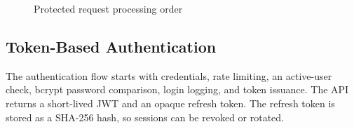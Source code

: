 \documentclass[letterpaper%
, oneside%
, 12pt%
, memoireprojet%
, english%
,creativecommons,hyperref, withAlgo2e %
]{thETS}
\begin{document}
\begin{figure}[htbp]
\centering
{}
\caption{Protected request processing order}
\label{fig:authorization_flow}
\end{figure}

\subsection{Token-Based Authentication}
The authentication flow starts with credentials, rate limiting, an active-user check, bcrypt password comparison, login logging, and token issuance. The API returns a short-lived JWT and an opaque refresh token. The refresh token is stored as a SHA-256 hash, so sessions can be revoked or rotated.
\end{document}
